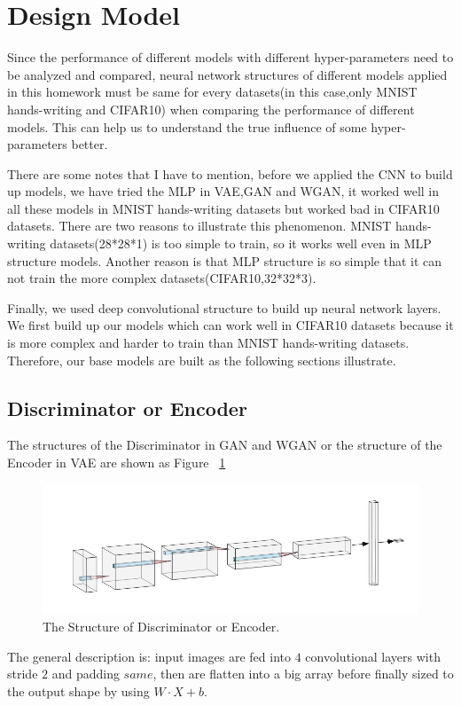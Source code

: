 \documentclass[12pt,letterpaper]{article}
\begin{document}
\section{Design Model}

Since the performance of different models with different hyper-parameters need to be analyzed and compared, neural network structures of different models applied in this homework must be same for every datasets(in this case,only MNIST hands-writing and CIFAR10) when comparing the performance of different models. This can help us to understand the true influence of some hyper-parameters better.

There are some notes that I have to mention, before we applied the CNN to build up models, we have tried the MLP in VAE,GAN and WGAN, it worked well in all these models in MNIST hands-writing datasets but worked bad in CIFAR10 datasets. There are two reasons to illustrate this phenomenon. MNIST hands-writing datasets(28*28*1) is too simple to train, so it works well even in MLP structure models. Another reason is that MLP structure is so simple that it can not train the more complex datasets(CIFAR10,32*32*3). 

Finally, we used deep convolutional structure to build up neural network layers. We first build up our models which can work well in CIFAR10 datasets because it is more complex and harder to train than MNIST hands-writing datasets. Therefore, our base models are built as the following sections illustrate.

\subsection{Discriminator or Encoder}

The structures of the Discriminator in GAN and WGAN or the structure of the Encoder in VAE are shown as Figure ~\ref{fig:disc}
\begin{figure}[h]
    \centering
    \includegraphics[width=.6\linewidth]{disc.jpg}
    \caption{\small The Structure of Discriminator or Encoder.}
    \label{fig:disc}
\end{figure}

The general description is: input images are fed into $4$ convolutional layers with stride $2$ and padding $same$, then are flatten into a big array before finally sized to the output shape by using $W \cdot X + b$.
\end{document}
